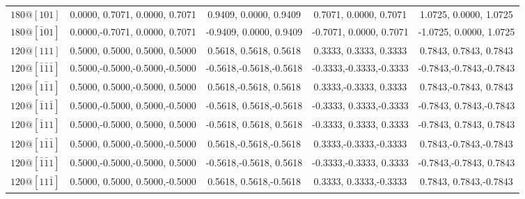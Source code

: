 \begin{table}[h!]
\begin{warpHTML}
\begin{tabular}{ccccc}
$180@[101]$ &  0.0000, 0.7071, 0.0000, 0.7071 &  0.9409, 0.0000, 0.9409 &  0.7071, 0.0000, 0.7071 &  1.0725, 0.0000, 1.0725 \\
$180@[\bar{1}01]$ &  0.0000,-0.7071, 0.0000, 0.7071 & -0.9409, 0.0000, 0.9409 & -0.7071, 0.0000, 0.7071 & -1.0725, 0.0000, 1.0725 \\
\hline
$120@[111]$ &  0.5000, 0.5000, 0.5000, 0.5000 &  0.5618, 0.5618, 0.5618 &  0.3333, 0.3333, 0.3333 &  0.7843, 0.7843, 0.7843 \\ 
$120@[\bar{1}\bar{1}\bar{1}]$ &  0.5000,-0.5000,-0.5000,-0.5000 & -0.5618,-0.5618,-0.5618 & -0.3333,-0.3333,-0.3333 & -0.7843,-0.7843,-0.7843 \\ 
$120@[1\bar{1}1]$ &  0.5000, 0.5000,-0.5000, 0.5000 &  0.5618,-0.5618, 0.5618 &  0.3333,-0.3333, 0.3333 &  0.7843,-0.7843, 0.7843 \\ 
$120@[\bar{1}1\bar{1}]$ &  0.5000,-0.5000, 0.5000,-0.5000 & -0.5618, 0.5618,-0.5618 & -0.3333, 0.3333,-0.3333 & -0.7843, 0.7843,-0.7843 \\
$120@[\bar{1}11]$ &  0.5000,-0.5000, 0.5000, 0.5000 & -0.5618, 0.5618, 0.5618 & -0.3333, 0.3333, 0.3333 & -0.7843, 0.7843, 0.7843 \\
$120@[1\bar{1}\bar{1}]$ &  0.5000, 0.5000,-0.5000,-0.5000 &  0.5618,-0.5618,-0.5618 &  0.3333,-0.3333,-0.3333 &  0.7843,-0.7843,-0.7843 \\ 
$120@[\bar{1}\bar{1}1]$ &  0.5000,-0.5000,-0.5000, 0.5000 & -0.5618,-0.5618, 0.5618 & -0.3333,-0.3333, 0.3333 & -0.7843,-0.7843, 0.7843 \\ 
$120@[11\bar{1}]$ &  0.5000, 0.5000, 0.5000,-0.5000 &  0.5618, 0.5618,-0.5618 &  0.3333, 0.3333,-0.3333 &  0.7843, 0.7843,-0.7843 \\ 
\hline
\end{tabular}
\end{warpHTML}
\begin{warpprint}
\end{warpprint}
\end{table}
